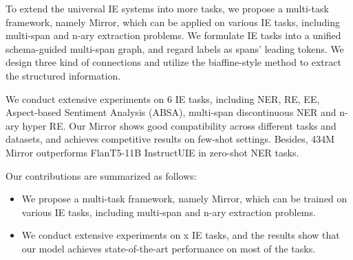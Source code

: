 To extend the universal IE systems into more tasks, we propose a multi-task framework, namely Mirror, which can be applied on various IE tasks, including multi-span and n-ary extraction problems.
We formulate IE tasks into a unified schema-guided multi-span graph, and regard labels as spans' leading tokens.
We design three kind of connections and utilize the biaffine-style method to extract the structured information.

We conduct extensive experiments on 6 IE tasks, including NER, RE, EE, Aspect-based Sentiment Analysis (ABSA), multi-span discontinuous NER and n-ary hyper RE.
Our Mirror shows good compatibility across different tasks and datasets, and achieves competitive results on few-shot settings.
Besides, 434M Mirror outperforms FlanT5-11B InstructUIE in zero-shot NER tasks.

Our contributions are summarized as follows:
\begin{itemize}
    \item We propose a multi-task framework, namely Mirror, which can be trained on various IE tasks, including multi-span and n-ary extraction problems.
    \item We conduct extensive experiments on x IE tasks, and the results show that our model achieves state-of-the-art performance on most of the tasks.
\end{itemize}
